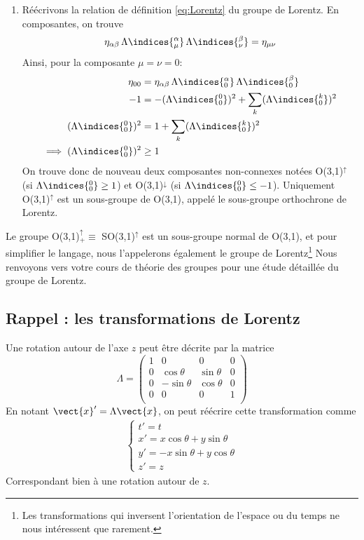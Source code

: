 {\begin{enumerate}
    \item Réécrivons la relation de définition \ref{eq:Lorentz} du groupe de Lorentz. En composantes, on trouve
    \begin{equation}
        \eta_{\alpha \beta}\, \Lambda\indices{^\alpha_{\mu}} \,\Lambda\indices{^\beta_{\nu}} = \eta_{\mu \nu}
    \end{equation}
    Ainsi, pour la composante $\mu = \nu =0$:
    \begin{align}
        \eta_{0 0} &= \eta_{\alpha \beta} \,\Lambda\indices{^\alpha_{0}} \, \Lambda\indices{^\beta_{0}} \\
        -1 &= -(\Lambda\indices{^0_{0}})^2 + \sum_{k}(\Lambda\indices{^k_0})^2\\
        (\Lambda\indices{^0_0})^2 &= 1 + \sum_{k}(\Lambda\indices{^k_0})^2\\
        \implies (\Lambda\indices{^0_0})^2 &\geq 1
    \end{align}
    On trouve donc de nouveau deux composantes non-connexes notées O(3,1)$^\uparrow$ (si $\Lambda\indices{^0_0} \geq 1$) et O(3,1)$^\downarrow$ (si $\Lambda\indices{^0_0} \leq - 1$). Uniquement O(3,1)$^\uparrow$ est un sous-groupe de O(3,1), appelé le sous-groupe orthochrone de Lorentz.
\end{enumerate}
Le groupe O(3,1)$^\uparrow_+ \equiv$ SO(3,1)$^\uparrow$ est un sous-groupe normal de O(3,1), et pour simplifier le langage, nous l'appelerons également le groupe de Lorentz\footnote{Les transformations qui inversent l'orientation de l'espace ou du temps ne nous intéressent que rarement.} Nous renvoyons vers votre cours de théorie des groupes pour une étude détaillée du groupe de Lorentz.
\subsection{Rappel : les transformations de Lorentz}

\begin{exmp}
    Une rotation autour de l'axe $z$ peut être décrite par la matrice
    \begin{equation}
        \Lambda = \begin{pmatrix}
1 & 0 & 0 & 0\\
0 & \cos{\theta} & \sin{\theta} & 0\\
0 & -\sin{\theta} & \cos{\theta} & 0\\
0 & 0 & 0 & 1\\
\end{pmatrix}
    \end{equation}
    En notant $\vect{x}'=\Lambda \vect{x}$, on peut réécrire cette transformation comme
    \begin{align}
    \left\{
\begin{array}{l}
  t' =t \\
  x' = x\cos{\theta} + y\sin{\theta}\\
  y' = -x\sin{\theta} + y\cos{\theta}\\
  z' = z
\end{array}
\right.
\end{align}
Correspondant bien à une rotation autour de $z$.
\end{exmp}

}
